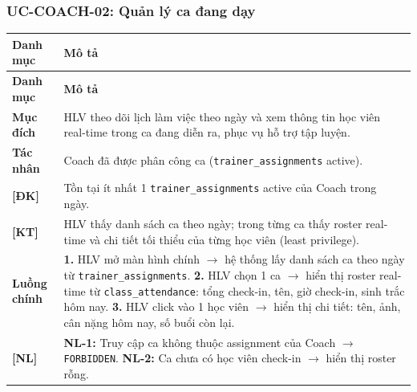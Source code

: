 \subsubsection{UC-COACH-02: Quản lý ca đang dạy}
\begingroup
\renewcommand{\arraystretch}{1.3}
\begin{longtable}{|>{\centering\arraybackslash}m{3cm}|>{\raggedright\arraybackslash}m{12cm}|}
\hline
\textbf{Danh mục} & \textbf{Mô tả} \\ \hline
\endfirsthead
\hline
\textbf{Danh mục} & \textbf{Mô tả} \\ \hline
\endhead
\hline
\endfoot
\textbf{Mục đích} & HLV theo dõi lịch làm việc theo ngày và xem thông tin học viên real-time trong ca đang diễn ra, phục vụ hỗ trợ tập luyện. \\
\hline
\textbf{Tác nhân} & Coach đã được phân công ca (\texttt{trainer\_assignments} active). \\
\hline
\textbf{[ĐK]} & Tồn tại ít nhất 1 \texttt{trainer\_assignments} active của Coach trong ngày. \\
\hline
\textbf{[KT]} & HLV thấy danh sách ca theo ngày; trong từng ca thấy roster real-time và chi tiết tối thiểu của từng học viên (least privilege). \\
\hline
\textbf{Luồng chính} & \textbf{1.} HLV mở màn hình chính $\rightarrow$ hệ thống lấy danh sách ca theo ngày từ \texttt{trainer\_assignments}. \textbf{2.} HLV chọn 1 ca $\rightarrow$ hiển thị roster real-time từ \texttt{class\_attendance}: tổng check-in, tên, giờ check-in, sinh trắc hôm nay. \textbf{3.} HLV click vào 1 học viên $\rightarrow$ hiển thị chi tiết: tên, ảnh, cân nặng hôm nay, số buổi còn lại. \\
\hline
\textbf{[NL]} & \textbf{NL-1:} Truy cập ca không thuộc assignment của Coach $\rightarrow$ \texttt{FORBIDDEN}. \textbf{NL-2:} Ca chưa có học viên check-in $\rightarrow$ hiển thị roster rỗng. \\
\hline
\end{longtable}
\endgroup


